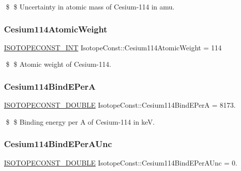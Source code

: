 \$ \$ Uncertainty in atomic mass of Cesium-\/114 in amu. \mbox{\label{group___isotope_const-_cesium-_cs114_ga39d7d14276bcf2695d91410c2c82afdc}} 
\subsubsection{\texorpdfstring{Cesium114\+Atomic\+Weight}{Cesium114AtomicWeight}}
{\footnotesize\ttfamily \mbox{\hyperlink{group___isotope_const-_macros_ga5f18360b3e99483a35c32d789e62621c}{I\+S\+O\+T\+O\+P\+E\+C\+O\+N\+S\+T\+\_\+\+I\+NT}} Isotope\+Const\+::\+Cesium114\+Atomic\+Weight = 114}

\$ \$ Atomic weight of Cesium-\/114. \mbox{\label{group___isotope_const-_cesium-_cs114_gab79a9a5edcfccc468d65b946ac7f1632}} 
\subsubsection{\texorpdfstring{Cesium114\+Bind\+E\+PerA}{Cesium114BindEPerA}}
{\footnotesize\ttfamily \mbox{\hyperlink{group___isotope_const-_macros_ga8f45a7272ce02c0b4c65c44636ed719a}{I\+S\+O\+T\+O\+P\+E\+C\+O\+N\+S\+T\+\_\+\+D\+O\+U\+B\+LE}} Isotope\+Const\+::\+Cesium114\+Bind\+E\+PerA = 8173.}

\$ \$ Binding energy per A of Cesium-\/114 in keV. \mbox{\label{group___isotope_const-_cesium-_cs114_gaf713e7b6eeee08e4d337c88267969864}} 
\subsubsection{\texorpdfstring{Cesium114\+Bind\+E\+Per\+A\+Unc}{Cesium114BindEPerAUnc}}
{\footnotesize\ttfamily \mbox{\hyperlink{group___isotope_const-_macros_ga8f45a7272ce02c0b4c65c44636ed719a}{I\+S\+O\+T\+O\+P\+E\+C\+O\+N\+S\+T\+\_\+\+D\+O\+U\+B\+LE}} Isotope\+Const\+::\+Cesium114\+Bind\+E\+Per\+A\+Unc = 0.}

